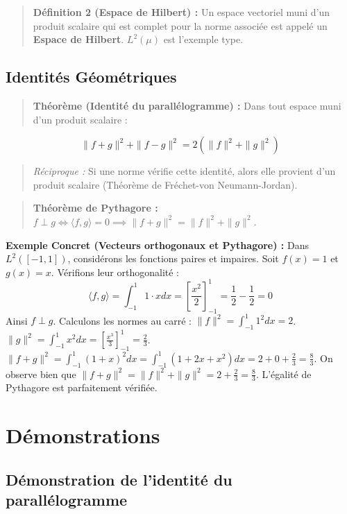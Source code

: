 \documentclass[11pt,a4paper]{article}
\begin{document}
\begin{quote}\textbf{Définition 2 (Espace de Hilbert) :}
Un espace vectoriel muni d'un produit scalaire qui est complet pour la norme associée est appelé un \textbf{Espace de Hilbert}. $L^2(\mu)$ est l'exemple type.\end{quote}

\subsection{Identités Géométriques}

\begin{quote}\textbf{Théorème (Identité du parallélogramme) :}
Dans tout espace muni d'un produit scalaire :
\end{quote}$$\|f+g\|^2 + \|f-g\|^2 = 2(\|f\|^2 + \|g\|^2)$$
\begin{quote}\textit{Réciproque :} Si une norme vérifie cette identité, alors elle provient d'un produit scalaire (Théorème de Fréchet-von Neumann-Jordan).\end{quote}

\begin{quote}\textbf{Théorème de Pythagore :}
$f \perp g \iff \langle f, g \rangle = 0 \implies \|f+g\|^2 = \|f\|^2 + \|g\|^2$.\end{quote}

\textbf{Exemple Concret (Vecteurs orthogonaux et Pythagore) :}
Dans $L^2([-1,1])$, considérons les fonctions paires et impaires. Soit $f(x) = 1$ et $g(x) = x$.
Vérifions leur orthogonalité :
$$ \langle f, g \rangle = \int_{-1}^1 1 \cdot x dx = \left[ \frac{x^2}{2} \right]_{-1}^1 = \frac{1}{2} - \frac{1}{2} = 0 $$
Ainsi $f \perp g$. Calculons les normes au carré :
$\|f\|^2 = \int_{-1}^1 1^2 dx = 2$.
$\|g\|^2 = \int_{-1}^1 x^2 dx = \left[ \frac{x^3}{3} \right]_{-1}^1 = \frac{2}{3}$.
$\|f+g\|^2 = \int_{-1}^1 (1+x)^2 dx = \int_{-1}^1 (1 + 2x + x^2) dx = 2 + 0 + \frac{2}{3} = \frac{8}{3}$.
On observe bien que $\|f+g\|^2 = \|f\|^2 + \|g\|^2 = 2 + \frac{2}{3} = \frac{8}{3}$. L'égalité de Pythagore est parfaitement vérifiée.

\section{Démonstrations}

\subsection{Démonstration de l'identité du parallélogramme}
\end{document}
